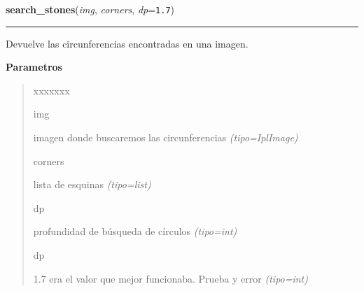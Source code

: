 \hspace{.8\funcindent}\begin{boxedminipage}{\funcwidth}

    \raggedright \textbf{search\_stones}(\textit{img}, \textit{corners}, \textit{dp}={\tt 1.7})

    \vspace{-1.5ex}

    \rule{\textwidth}{0.5\fboxrule}
\setlength{\parskip}{2ex}
Devuelve las circunferencias encontradas en una imagen.

\setlength{\parskip}{1ex}
      \textbf{Parametros}
      \vspace{-1ex}

      \begin{quote}
        \begin{Ventry}{xxxxxxx}

          \item[img]


imagen donde buscaremos las circunferencias
            {\it (tipo=IplImage)}

          \item[corners]


lista de esquinas
            {\it (tipo=list)}

          \item[dp]


profundidad de búsqueda de círculos
            {\it (tipo=int)}

          \item[dp]


1.7 era el valor que mejor funcionaba. Prueba y error
            {\it (tipo=int)}

        \end{Ventry}

      \end{quote}

    \end{boxedminipage}

    \label{src:search_stones:check_color_stone}

    \vspace{0.5ex}

